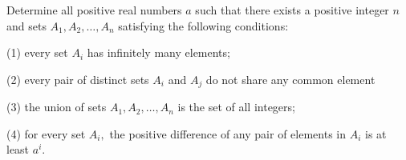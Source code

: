 Determine all positive real numbers $ a$ such that there exists a positive integer $ n$ and sets $ A_1, A_2, \ldots, A_n$ satisfying the following conditions:

(1) every set $ A_i$ has infinitely many elements;

(2) every pair of distinct sets $ A_i$ and $ A_j$ do not share any common element

(3) the union of sets $ A_1, A_2, \ldots, A_n$ is the set of all integers;

(4) for every set $ A_i,$ the positive difference of any pair of elements in $ A_i$ is at least $ a^i.$